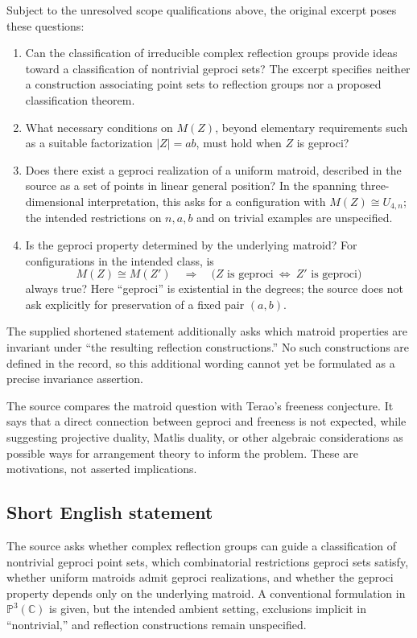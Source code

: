 \documentclass[11pt]{article}
\newcommand{\C}{\mathbb{C}}
\newcommand{\PP}{\mathbb{P}}
\begin{document}
Subject to the unresolved scope qualifications above, the original excerpt poses these questions:
\begin{enumerate}
\item Can the classification of irreducible complex reflection groups provide ideas toward a classification of nontrivial geproci sets? The excerpt specifies neither a construction associating point sets to reflection groups nor a proposed classification theorem.
\item What necessary conditions on \(M(Z)\), beyond elementary requirements such as a suitable factorization \(|Z|=ab\), must hold when \(Z\) is geproci?
\item Does there exist a geproci realization of a uniform matroid, described in the source as a set of points in linear general position? In the spanning three-dimensional interpretation, this asks for a configuration with \(M(Z)\cong U_{4,n}\); the intended restrictions on \(n,a,b\) and on trivial examples are unspecified.
\item Is the geproci property determined by the underlying matroid? For configurations in the intended class, is
\[
M(Z)\cong M(Z')\quad\Longrightarrow\quad
\bigl(Z\text{ is geproci}\ \Longleftrightarrow\ Z'\text{ is geproci}\bigr)
\]
always true? Here ``geproci'' is existential in the degrees; the source does not ask explicitly for preservation of a fixed pair \((a,b)\).
\end{enumerate}
The supplied shortened statement additionally asks which matroid properties are invariant under ``the resulting reflection constructions.'' No such constructions are defined in the record, so this additional wording cannot yet be formulated as a precise invariance assertion.

The source compares the matroid question with Terao's freeness conjecture. It says that a direct connection between geproci and freeness is not expected, while suggesting projective duality, Matlis duality, or other algebraic considerations as possible ways for arrangement theory to inform the problem. These are motivations, not asserted implications.
\subsection{Short English statement}
The source asks whether complex reflection groups can guide a classification of nontrivial geproci point sets, which combinatorial restrictions geproci sets satisfy, whether uniform matroids admit geproci realizations, and whether the geproci property depends only on the underlying matroid. A conventional formulation in \(\PP^3(\C)\) is given, but the intended ambient setting, exclusions implicit in ``nontrivial,'' and reflection constructions remain unspecified.
\end{document}

